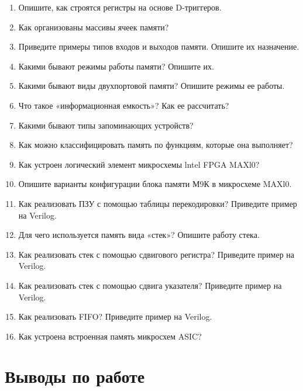 \documentclass[a4paper,14pt]{article}
\begin{document}
	\begin{enumerate}
		\item Опишите, как строятся регистры на основе D-триггеров.
		
		\item Как организованы массивы ячеек памяти?
		
		\item Приведите примеры типов входов и выходов памяти. Опишите их назначение.
		
		\item Какими бывают режимы работы памяти? Опишите их.
		
		\item Какими бывают виды двухпортовой памяти? Опишите режимы ее работы.
		
		\item Что такое «информационная емкость»? Как ее рассчитать?
		
		\item Какими бывают типы запоминающих устройств?
		
		\item Как можно классифицировать память по функциям, которые она выполняет?
		
		\item Как устроен логический элемент микросхемы lntel FPGA MAXl0?
		
		\item Опишите варианты конфигурации блока памяти М9К в микросхеме MAXl0.
		
		\item Как реализовать ПЗУ с помощью таблицы перекодировки? Приведите пример на Verilog.
		
		\item Для чего используется память вида «стек»? Опишите работу стека.
		
		\item Как реализовать стек с помощью сдвигового регистра? Приведите пример на Verilog.
		
		\item Как реализовать стек с помощью сдвига указателя? Приведите пример на Verilog.
		
		\item Как реализовать FIFO? Приведите пример на Verilog.
		
		\item Как устроена встроенная память микросхем ASIC?
	\end{enumerate}
	
	\section{Выводы по работе}
	
\end{document}
